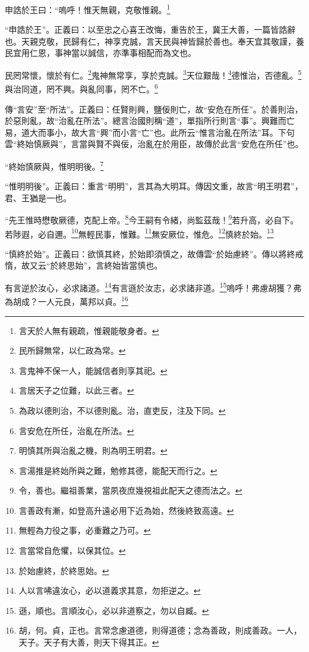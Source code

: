 申誥於王曰：“嗚呼！惟天無親，克敬惟親。\footnote{言天於人無有親疏，惟親能敬身者。}

{\noindent\shu{}\fzkt “申誥於王”。正義曰：以至忠之心喜王改悔，重告於王，冀王大善，一篇皆誥辭也。天親克敬，民歸有仁，神享克誠，言天民與神皆歸於善也。奉天宜其敬謹，養民宜用仁恩，事神當以誠信，亦準事相配而為文也。 \par}

民罔常懷，懷於有仁。\footnote{民所歸無常，以仁政為常。}鬼神無常享，享於克誠。\footnote{言鬼神不保一人，能誠信者則享其祀。}天位艱哉！\footnote{言居天子之位難，以此三者。}德惟治，否德亂。\footnote{為政以德則治，不以德則亂。治，直吏反，注及下同。}與治同道，罔不興。與亂同事，罔不亡。\footnote{言安危在所任，治亂在所法。}

{\noindent\zhuan{}\fzbyks 傳“言安”至“所法”。正義曰：任賢則興，鹽佞則亡，故“安危在所任”。於善則治，於惡則亂，故“治亂在所法”。總言治國則稱“道”，單指所行則言“事”。興難而亡易，道大而事小，故大言“興”而小言“亡”也。此所云“惟言治亂在所法”耳。下句雲“終始慎厥與”，言當與賢不與佞，治亂在於用臣，故傳於此言“安危在所任”也。 \par}

“終始慎厥與，惟明明後。\footnote{明慎其所與治亂之機，則為明王明君。}

{\noindent\shu{}\fzkt “惟明明後”。正義曰：重言“明明”，言其為大明耳。傳因文重，故言“明王明君”，君、王猶是一也。 \par}

“先王惟時懋敬厥德，克配上帝。\footnote{言湯推是終始所與之難，勉修其德，能配天而行之。}今王嗣有令緒，尚監茲哉！\footnote{令，善也。繼祖善業，當夙夜庶幾視祖此配天之德而法之。}若升高，必自下。若陟遐，必自邇。\footnote{言善政有漸，如登高升遠必用下近為始，然後終致高遠。}無輕民事，惟難。\footnote{無輕為力役之事，必重難之乃可。}無安厥位，惟危。\footnote{言當常自危懼，以保其位。}慎終於始。\footnote{於始慮終，於終思始。}

{\noindent\shu{}\fzkt “慎終於始”。正義曰：欲慎其終，於始即須慎之，故傳雲“於始慮終”。傳以將終戒惰，故又云“於終思始”，言終始皆當慎也。 \par}

有言逆於汝心，必求諸道。\footnote{人以言咈違汝心，必以道義求其意，勿拒逆之。}有言遜於汝志，必求諸非道。\footnote{遜，順也。言順汝心，必以非道察之，勿以自臧。}嗚呼！弗慮胡獲？弗為胡成？一人元良，萬邦以貞。\footnote{胡，何。貞，正也。言常念慮道德，則得道德；念為善政，則成善政。一人，天子。天子有大善，則天下得其正。}

